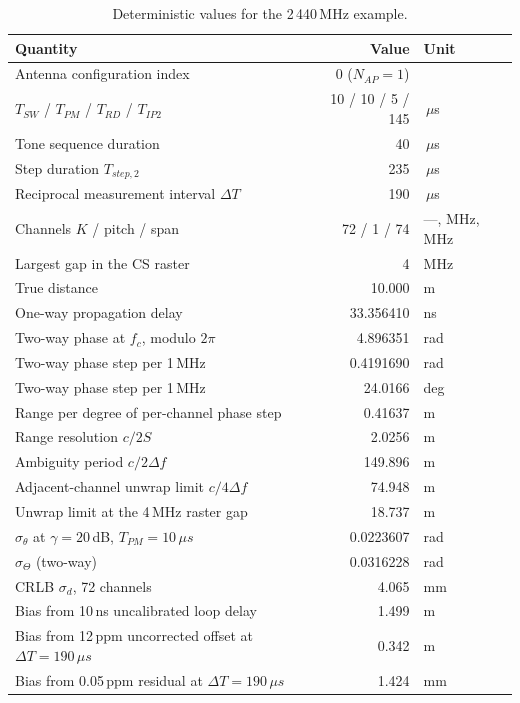 \documentclass[11pt,a4paper]{article}
\newcommand{\us}{\,\ensuremath{\upmu}s}
\newcommand{\Tsw}{T_{SW}}
\newcommand{\Tpm}{T_{PM}}
\newcommand{\Trd}{T_{RD}}
\newcommand{\Tipp}{T_{IP2}}
\newcommand{\Nap}{N_{AP}}
\providecommand{\upmu}{\mu}
\begin{document}
\begin{table}[h]
\caption{Deterministic values for the 2\,440\,MHz example.}
\label{tab:exvalues}
\centering\small
\begin{tabular}{@{}L{62mm}rl@{}}
\toprule
Quantity & Value & Unit \\
\midrule
Antenna configuration index & 0 ($\Nap=1$) & \\
$\Tsw$ / $\Tpm$ / $\Trd$ / $\Tipp$ & 10 / 10 / 5 / 145 & \us \\
Tone sequence duration & 40 & \us \\
Step duration $T_{step,2}$ & 235 & \us \\
Reciprocal measurement interval $\Delta T$ & 190 & \us \\
Channels $K$ / pitch / span & 72 / 1 / 74 & ---, MHz, MHz \\
Largest gap in the CS raster & 4 & MHz \\
True distance & 10.000 & m \\
One-way propagation delay & 33.356410 & ns \\
Two-way phase at $f_c$, modulo $2\pi$ & 4.896351 & rad \\
Two-way phase step per 1\,MHz & 0.4191690 & rad \\
Two-way phase step per 1\,MHz & 24.0166 & deg \\
Range per degree of per-channel phase step & 0.41637 & m \\
Range resolution $c/2S$ & 2.0256 & m \\
Ambiguity period $c/2\Delta f$ & 149.896 & m \\
Adjacent-channel unwrap limit $c/4\Delta f$ & 74.948 & m \\
Unwrap limit at the 4\,MHz raster gap & 18.737 & m \\
$\sigma_\theta$ at $\gamma=20$\,dB, $\Tpm=10\us$ & 0.0223607 & rad \\
$\sigma_\Theta$ (two-way) & 0.0316228 & rad \\
CRLB $\sigma_d$, 72 channels & 4.065 & mm \\
Bias from 10\,ns uncalibrated loop delay & 1.499 & m \\
Bias from 12\,ppm uncorrected offset at $\Delta T=190\us$ & 0.342 & m \\
Bias from 0.05\,ppm residual at $\Delta T=190\us$ & 1.424 & mm \\
\bottomrule
\end{tabular}
\end{table}
\end{document}
